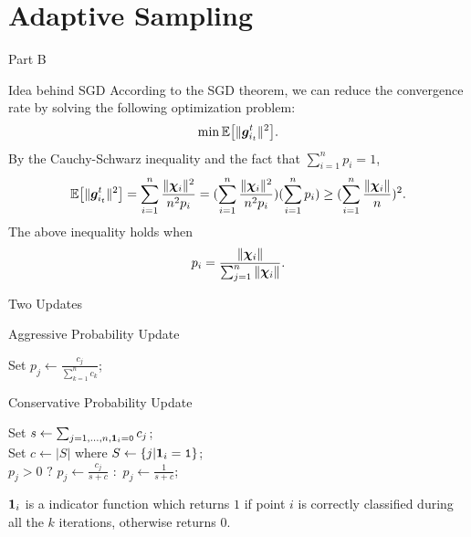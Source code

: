 \section{Adaptive Sampling}
\begin{frame}{Part B}
\Large \center{\color{blue}{Adaptive Sampling Algorithms}}
\end{frame}

\begin{frame}{Idea behind SGD}
According to the SGD theorem, we can reduce the convergence rate by solving the following optimization problem:
\[
    \min \mathbb{E}\big[\|\bm{g}_{i_t}^t\|^2\big].
\]
By the Cauchy-Schwarz inequality and the fact that $\sum_{i=1}^n p_i = 1$,
\[ 
    \mathbb{E}\big[\|\bm{g}_{i_t}^t\|^2\big] = \sum_{i=1}^n \frac{\|\bm{\chi}_i\|^2}{n^2p_i} = (\sum_{i=1}^n \frac{\|\bm{\chi}_i\|^2}{n^2p_i}) (\sum_{i=1}^n p_i) \ge (\sum_{i=1}^n \frac{\|\bm{\chi}_i\|}{n})^2.
\]
The above inequality holds when 
\begin{equation*}\label{eq:p_optimal}
    p_i = \frac{\|\bm{\chi}_i\|}{\sum_{j=1}^n \|\bm{\chi}_i\|}.
\end{equation*}

\end{frame}

\begin{frame}{Two Updates}
\begin{algorithm}[H]
    \label{alg:AggUpdate}
    \caption{Aggressive Probability Update}
    \SetAlgoLined
     {
	Set $p_j \leftarrow \frac{c_j}{\sum_{k=1}^n c_k}$;
    }
    \end{algorithm}
\begin{algorithm}[H]    
    \label{alg:ConUpdate}
    \caption{Conservative Probability Update}
    \SetAlgoLined
    Set $s \leftarrow \sum_{j=1,\dots, n, \bm{1}_i=\texttt{0}} c_j$; \\
    Set $c \leftarrow |S|$ where $S \leftarrow \{j | \bm{1}_i=\texttt{1}\}$; \\
     {
	    $p_j>0$ $?$ {$p_j \leftarrow \frac{c_j}{s+c}$} $\colon$ {$p_j \leftarrow \frac{1}{s+c}$; } 
    } 
\end{algorithm} 
\Tiny $\bm{1}_i$ is a indicator function which returns $1$ if point $i$ is correctly classified during all the $k$ iterations, otherwise returns $0$.
\end{frame}

